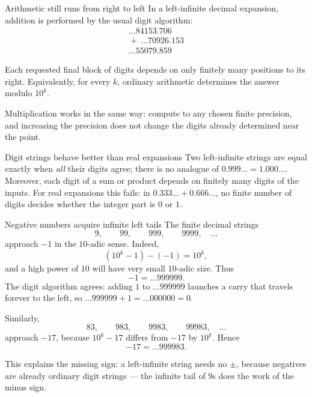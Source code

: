 \documentclass[aspectratio=169,11pt]{beamer}
\begin{document}
\begin{frame}{Arithmetic still runs from right to left}
  In a left-infinite decimal expansion, addition is performed by the usual
  digit algorithm:
  \[
    \begin{array}{r}
      \ldots84153.706\\
      {}+\ \ldots70926.153\\ \hline
      \ldots55079.859
    \end{array}
  \]

  Each requested final block of digits depends on only finitely many
  positions to its right.  Equivalently, for every \(k\), ordinary arithmetic
  determines the answer modulo \(10^k\).

  Multiplication works in the same way: compute to any chosen finite
  precision, and increasing the precision does not change the digits already
  determined near the point.

  \begin{block}{Digit strings behave better than real expansions}
    Two left-infinite strings are equal exactly when \emph{all} their
    digits agree; there is no analogue of \(0.999\ldots=1.000\ldots\).
    Moreover, each digit of a sum or product depends on finitely many
    digits of the inputs.  For real expansions this fails: in
    \(0.333\ldots+0.666\ldots\), no finite number of digits decides
    whether the integer part is \(0\) or \(1\).
  \end{block}
\end{frame}

\begin{frame}{Negative numbers acquire infinite left tails}
  \small
  The finite decimal strings
  \[
    9,\qquad99,\qquad999,\qquad9999,\quad\ldots
  \]
  approach \(-1\) in the \(10\)-adic sense.  Indeed,
  \[
    (10^k-1)-(-1)=10^k,
  \]
  and a high power of \(10\) will have very small \(10\)-adic size.  Thus
  \[
    \boxed{-1=\ldots999999.}
  \]
  The digit algorithm agrees: adding \(1\) to \(\ldots999999\) launches a
  carry that travels forever to the left, so
  \(\ldots999999+1=\ldots000000=0\).

  Similarly,
  \[
    83,\qquad983,\qquad9983,\qquad99983,\quad\ldots
  \]
  approach \(-17\), because \(10^k-17\) differs from \(-17\) by \(10^k\).
  Hence
  \[
    \boxed{-17=\ldots999983.}
  \]

  This explains the missing sign: a left-infinite string needs no
  \(\pm\), because negatives are already ordinary digit strings --- the
  infinite tail of \(9\)s does the work of the minus sign.
\end{frame}
\end{document}
